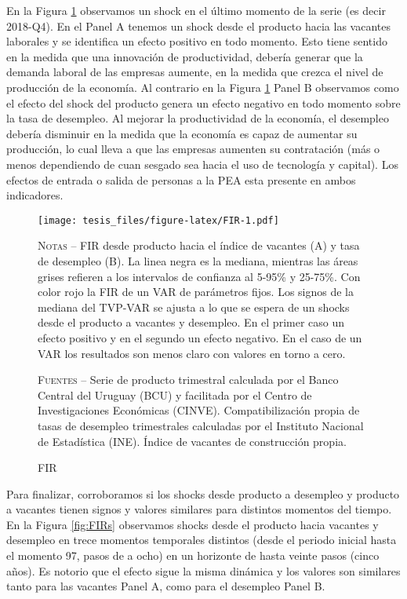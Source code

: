 \documentclass[12pt,oneside]{reedthesis}
\makeatletter
\def\maxwidth{ %
  \ifdim\Gin@nat@width>\linewidth
    \linewidth
  \else
    \Gin@nat@width
  \fi
}
\makeatother
\begin{document}
En la Figura \ref{fig:FIR} observamos un shock en el último momento de la serie (es decir 2018-Q4). En el Panel A tenemos un shock desde el producto hacia las vacantes laborales y se identifica un efecto positivo en todo momento. Esto tiene sentido en la medida que una innovación de productividad, debería generar que la demanda laboral de las empresas aumente, en la medida que crezca el nivel de producción de la economía. Al contrario en la Figura \ref{fig:FIR} Panel B observamos como el efecto del shock del producto genera un efecto negativo en todo momento sobre la tasa de desempleo. Al mejorar la productividad de la economía, el desempleo debería disminuir en la medida que la economía es capaz de aumentar su producción, lo cual lleva a que las empresas aumenten su contratación (más o menos dependiendo de cuan sesgado sea hacia el uso de tecnología y capital). Los efectos de entrada o salida de personas a la PEA esta presente en ambos indicadores.
\begin{figure}
\texttt{[image: tesis\_files/figure-latex/FIR-1.pdf]}
\caption{FIR}\label{fig:FIR}\textsc{}

\footnotesize\textsc{Notas} -- FIR desde producto hacia el índice de vacantes (A) y tasa de desempleo (B). La linea negra es la mediana, mientras las áreas grises refieren a los intervalos de confianza al 5-95\% y 25-75\%. Con color rojo la FIR de un VAR de parámetros fijos. Los signos de la mediana del TVP-VAR se ajusta a lo que se espera de un shocks desde el producto a vacantes y desempleo. En el primer caso un efecto positivo y en el segundo un efecto negativo. En el caso de un VAR los resultados son menos claro con valores en torno a cero.

\textsc{Fuentes} -- Serie de producto trimestral calculada por el Banco Central del Uruguay (BCU) y facilitada por el Centro de Investigaciones Económicas (CINVE). Compatibilización propia de tasas de desempleo trimestrales calculadas por el Instituto Nacional de Estadística (INE). Índice de vacantes de construcción propia.
\end{figure}
Para finalizar, corroboramos si los shocks desde producto a desempleo y producto a vacantes tienen signos y valores similares para distintos momentos del tiempo. En la Figura \ref{fig:FIRs} observamos shocks desde el producto hacia vacantes y desempleo en trece momentos temporales distintos (desde el periodo inicial hasta el momento 97, pasos de a ocho) en un horizonte de hasta veinte pasos (cinco años). Es notorio que el efecto sigue la misma dinámica y los valores son similares tanto para las vacantes Panel A, como para el desempleo Panel B.
\end{document}
